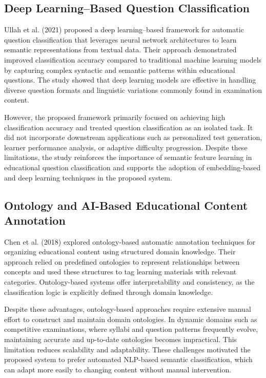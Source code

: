 \begin{sloppypar}
\subsection{Deep Learning--Based Question Classification}

Ullah et al. (2021) \cite{ullah2021automatic} proposed a deep learning--based framework for automatic question classification that leverages neural network architectures to learn semantic representations from textual data. Their approach demonstrated improved classification accuracy compared to traditional machine learning models by capturing complex syntactic and semantic patterns within educational questions. The study showed that deep learning models are effective in handling diverse question formats and linguistic variations commonly found in examination content.

However, the proposed framework primarily focused on achieving high classification accuracy and treated question classification as an isolated task. It did not incorporate downstream applications such as personalized test generation, learner performance analysis, or adaptive difficulty progression. Despite these limitations, the study reinforces the importance of semantic feature learning in educational question classification and supports the adoption of embedding-based and deep learning techniques in the proposed system.

\subsection{Ontology and AI-Based Educational Content Annotation}

Chen et al. (2018) \cite{chen2018ontology} explored ontology-based automatic annotation techniques for organizing educational content using structured domain knowledge. Their approach relied on predefined ontologies to represent relationships between concepts and used these structures to tag learning materials with relevant categories. Ontology-based systems offer interpretability and consistency, as the classification logic is explicitly defined through domain knowledge.

Despite these advantages, ontology-based approaches require extensive manual effort to construct and maintain domain ontologies. In dynamic domains such as competitive examinations, where syllabi and question patterns frequently evolve, maintaining accurate and up-to-date ontologies becomes impractical. This limitation reduces scalability and adaptability. These challenges motivated the proposed system to prefer automated NLP-based semantic classification, which can adapt more easily to changing content without manual intervention.


\end{sloppypar}
